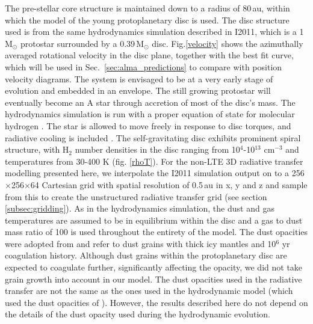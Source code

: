 \documentclass[useAMS,usenatbib]{mn2e}
\begin{document}
The pre-stellar core structure is maintained down to a radius of 80\,au, within which the model of the young protoplanetary disc is used. The disc structure used is from the same hydrodynamics simulation described in I2011, which is a 1$\,$M$_\odot$ protostar surrounded by a 0.39$\,$M$_\odot$ disc. Fig.\ref{velocity} shows the azimuthally averaged rotational velocity in the disc plane, together with the best fit curve, which will be used in Sec.~\ref{sec:alma_predictions} to compare with position velocity diagrams. The system is envisaged to be at a very early stage of evolution and embedded in an envelope.  The still growing protostar will eventually become an A star through accretion of most of the disc's mass. The hydrodynamics simulation is run with a proper equation of state for molecular hydrogen \citep{Boley2007}.  The star is allowed to move freely in response to disc torques, and radiative cooling is included \citep{Boley2009}. The self-gravitating disc exhibits prominent spiral structure, with H$_2$ number densities in the disc ranging from 10$^4$-10$^{13}$ cm$^{-3}$ and temperatures from 30-400 K (fig. \ref{rhoT}). For the non-LTE 3D radiative transfer modelling presented here, we interpolate the I2011 simulation output on to a 256$\times$256$\times$64 Cartesian grid with spatial resolution of 0.5$\,$au in x, y and z and sample from this to create the unstructured radiative transfer grid (see section \ref{subsec:gridding}).  As in the hydrodynamics simulation, the dust and gas temperatures are assumed to be in equilibrium within the disc and a gas to dust mass ratio of 100 is used throughout the entirety of the model. The dust opacities were adopted from \citet{Ossenkopf1994} and refer to dust grains with thick icy mantles and 10$^6$ yr coagulation history.  Although dust grains within the protoplanetary disc are expected to coagulate further,  significantly affecting the opacity, we did not take grain growth into account in our model.  The dust opacities used in the radiative transfer are not the same as the ones used in the hydrodynamic model (which used the dust opacities of \citealt{DAlessio2001}). However, the results described here do not depend on the details of the dust opacity used during the hydrodynamic evolution.\smallskip
\end{document}
